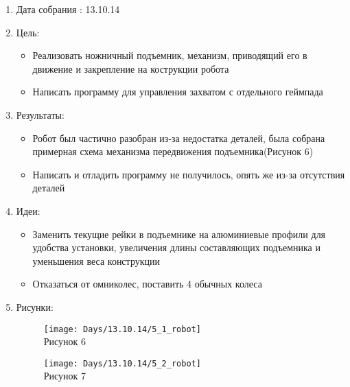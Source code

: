 
	\begin{enumerate}
		\item Дата собрания : 13.10.14
		\item Цель:
		\begin{itemize}
			\item Реализовать ножничный подъемник, механизм, приводящий его в движение и закрепление на кострукции робота
			\item Написать программу для управления захватом с отдельного геймпада
		\end{itemize}
		\item Результаты:
		\begin{itemize}
			\item Робот был частично разобран из-за недостатка деталей, была собрана примерная схема механизма передвижения подъемника(Рисунок 6)
			\item Написать и отладить программу не получилось, опять же из-за отсутствия деталей
		\end{itemize}
		\item Идеи:
		\begin{itemize}
			\item Заменить текущие рейки в подъемнике на алюминиевые профили для удобства установки, увеличения длины составляющих подъемника и уменьшения веса конструкции
			\item Отказаться от омниколес, поставить 4 обычных колеса
		\end{itemize}
		\item Рисунки:
		\begin{figure} [h]
			\centering
			\begin{minipage}{0.3\linewidth}
				\texttt{[image: Days/13.10.14/5\_1\_robot]}\\ Рисунок 6
			\end{minipage}
			\begin{minipage}{0.3\linewidth}
				\texttt{[image: Days/13.10.14/5\_2\_robot]}\\ Рисунок 7
			\end{minipage}
		\end{figure}
	\end{enumerate}
	\newpage
